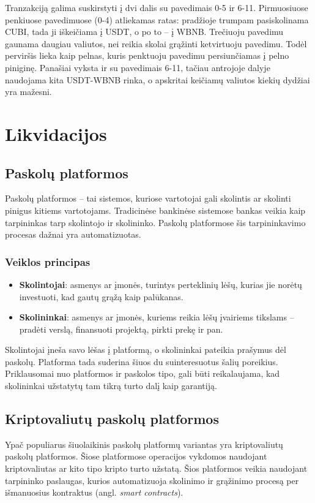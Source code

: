 \documentclass{VUMIFPSkursinis}
\begin{document}
Tranzakciją galima suskirstyti į dvi dalis su pavedimais 0-5 ir 6-11. Pirmuosiuose penkiuose pavedimuose (0-4) atliekamas ratas: pradžioje trumpam pasiskolinama CUBI, tada ji iškeičiama į USDT, o po to -- į WBNB. Trečiuoju pavedimu gaunama daugiau valiutos, nei reikia skolai grąžinti ketvirtuoju pavedimu. Todėl perviršis lieka kaip pelnas, kuris penktuoju pavedimu persiunčiamas į pelno piniginę. Panašiai vyksta ir su pavedimais 6-11, tačiau antrojoje dalyje naudojama kita USDT-WBNB rinka, o apskritai keičiamų valiutos kiekių dydžiai yra mažesni.

\section{Likvidacijos}

\subsection{Paskolų platformos}
Paskolų platformos – tai sistemos, kuriose vartotojai gali skolintis ar skolinti pinigus kitiems vartotojams. Tradicinėse bankinėse sistemose bankas veikia kaip tarpininkas tarp skolintojo ir skolininko. Paskolų platformose šis tarpininkavimo procesas dažnai yra automatizuotas.

\subsubsection{Veiklos principas}
\begin{itemize}
    \item \textbf{Skolintojai}: asmenys ar įmonės, turintys perteklinių lėšų, kurias jie norėtų investuoti, kad gautų grąžą kaip palūkanas.
    \item \textbf{Skolininkai}: asmenys ar įmonės, kuriems reikia lėšų įvairiems tikslams – pradėti verslą, finansuoti projektą, pirkti prekę ir pan.
\end{itemize}

Skolintojai įneša savo lėšas į platformą, o skolininkai pateikia prašymus dėl paskolų. Platforma tada suderina šiuos du suinteresuotus šalių poreikius. Priklausomai nuo platformos ir paskolos tipo, gali būti reikalaujama, kad skolininkai užstatytų tam tikrą turto dalį kaip garantiją.

\subsection{Kriptovaliutų paskolų platformos}
Ypač populiarus šiuolaikinis paskolų platformų variantas yra kriptovaliutų paskolų platformos. Šiose platformose operacijos vykdomos naudojant kriptovaliutas ar kito tipo kripto turto užstatą. Šios platformos veikia naudojant tarpininko paslaugas, kurios automatizuoja skolinimo ir grąžinimo procesą per išmanuosius kontraktus (angl. \textit{smart contracts}).
\end{document}
